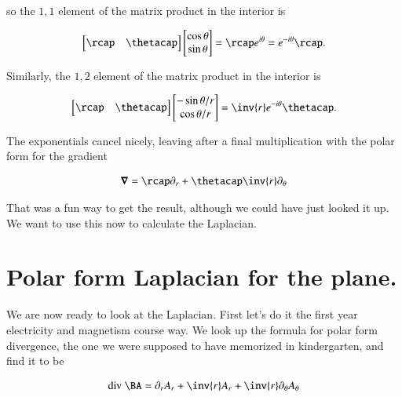 so the $1,1$ element of the matrix product in the interior is

\begin{align}\label{eqn:divGradCurLap:9a}
\begin{bmatrix}
\rcap & \thetacap
\end{bmatrix}
\begin{bmatrix}
\cos\theta \\
\sin\theta 
\end{bmatrix}
=
\rcap e^{i\theta} = e^{-i\theta}\rcap.
\end{align}

Similarly, the $1,2$ element of the matrix product in the interior is

\begin{align}\label{eqn:divGradCurLap:9b}
\begin{bmatrix}
\rcap & \thetacap
\end{bmatrix}
\begin{bmatrix}
-\sin\theta/r \\
\cos\theta/r
\end{bmatrix}
=
\inv{r} e^{-i\theta} \thetacap.
\end{align}

The exponentials cancel nicely, leaving after a final multiplication with the polar form for the gradient

\begin{align}\label{eqn:divGradCurLap:10}
\spacegrad = \rcap \partial_r + \thetacap \inv{r} \partial_\theta
\end{align}

That was a fun way to get the result, although we could have just looked it up.  We want to use this now to calculate the Laplacian.

\section{Polar form Laplacian for the plane.}

We are now ready to look at the Laplacian.  First let's do it the first year electricity and magnetism course way.  We look up the formula for polar form divergence, the one we were supposed to have memorized in kindergarten, and find it to be

\begin{align}\label{eqn:divGradCurLap:11}
\text{div}\ \BA = \partial_r A_r + \inv{r} A_r + \inv{r} \partial_\theta A_\theta
\end{align}

